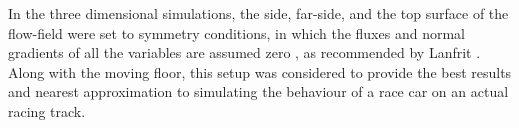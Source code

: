 \noindent In the three dimensional simulations, the side, far-side, and the top surface of the flow-field were set to symmetry conditions, in which the fluxes and normal gradients of all the variables are assumed zero \cite{ANSYS2009SymmetryConditions}, as recommended by Lanfrit \cite{Lanfrit2005BestFLUENT}. Along with the moving floor, this setup was considered to provide the best results and nearest approximation to simulating the behaviour of a race car on an actual racing track.





